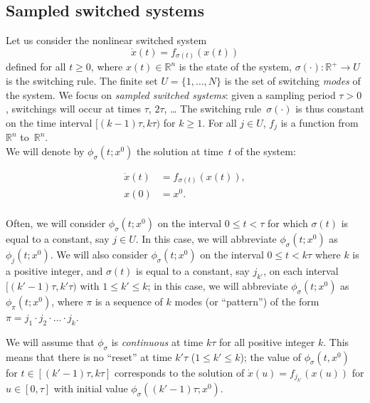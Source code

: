 \subsection{Sampled switched systems}\label{ss:switch}
Let us consider the nonlinear switched system
\begin{equation}
 \dot  x(t) = f_{\sigma (t)}( x(t))
 \label{eq:sys_part4}
\end{equation}
defined for all $t \geq 0$, where $ x(t) \in \mathbb{R}^n$ is the state
of the system, $\sigma(\cdot) : \mathbb{R}^+ \longrightarrow U$ is the
switching rule. The finite set $U = \{ 1, \dots , N \}$ is the set of
switching {\em modes} of the system.  We focus on {\em sampled switched systems}:
given a sampling period $\tau >0$, switchings will occur at times
$\tau$, $2\tau$, \dots{} The switching rule~$\sigma(\cdot)$ is thus constant
on the time interval $\lbrack (k-1) \tau , k \tau )$ for $k \geq 1$.
For all $j\in U$, $f_j$ is a function from $\mathbb{R}^n$ to~$\mathbb{R}^n$.\\

We will denote by $\phi_\sigma(t; x^0)$ the
solution at time~$t$ of the system:

\begin{equation}
\begin{aligned}
  \dot  x(t) & =  f_{\sigma (t)}( x(t)), \\
   x(0) & =   x^0. \\
\end{aligned}
 \label{eq:sampled-switch-sys}
\end{equation}
%


Often, we will consider $\phi_\sigma(t;x^0)$ on the interval $0\leq t<\tau$ for which $\sigma(t)$ is equal to a constant, say $j\in U$. In this case, we will abbreviate $\phi_\sigma(t;x^0)$ as $\phi_j(t;x^0)$. We will also consider $\phi_\sigma(t;x^0)$ on the interval $0\leq t<k\tau$
where $k$ is a positive integer, and
$\sigma(t)$ is equal to a constant, say $j_{k'}$,
on each interval
$[(k'-1)\tau,k'\tau)$ with $1\leq k'\leq k$; in this case,
we will abbreviate $\phi_\sigma(t;x^0)$ as $\phi_\pi(t;x^0)$,
where $\pi$ is a sequence of $k$ modes (or ``pattern'') of the form
$\pi=j_1\cdot j_2\cdot\dots\cdot j_k$.

We will assume that $\phi_\sigma$ is {\em continuous} at time $k\tau$ for all positive integer $k$.
This means that there is no ``reset'' at time $k'\tau$ ($1\leq k'\leq k$);
the value of
$\phi_\sigma(t,x^0)$ for $t\in[(k'-1)\tau,k\tau]$
corresponds to the solution of $\dot{x}(u)=f_{j_{k'}}(x(u))$  for $u\in [0,\tau]$
with initial value $\phi_\sigma((k'-1)\tau;x^0)$.\\

